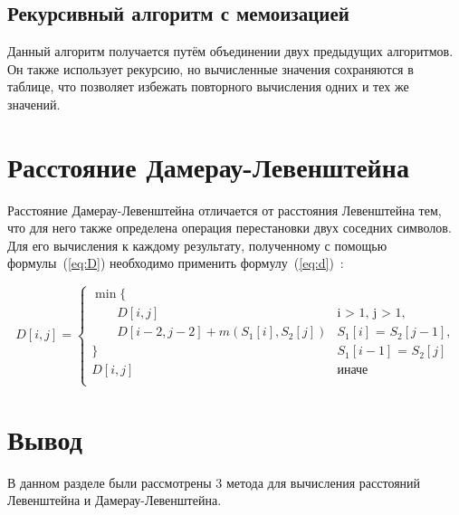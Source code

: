 \subsection{Рекурсивный алгоритм с мемоизацией}

Данный алгоритм получается путём объединении двух предыдущих алгоритмов. Он также использует рекурсию, но вычисленные значения сохраняются в таблице, что позволяет избежать повторного вычисления одних и тех же значений.

\section{Расстояние Дамерау-Левенштейна}

Расстояние Дамерау-Левенштейна отличается от расстояния Левенштейна тем, что для него также определена операция перестановки двух соседних символов. Для его вычисления к каждому результату, полученному с помощью формулы~(\ref{eq:D}) необходимо применить формулу~(\ref{eq:d})~\cite{levenshtein2}:

\begin{equation}
	\label{eq:d}
	D[i, j]= \begin{cases}
		\min \lbrace & \text{} \\
		\qquad D[i, j] & \text{i > 1, j > 1,} \\
		\qquad D[i-2, j-2] + m(S_1[i], S_2[j]) & \text{$S_1[i]$ = $S_2[j-1]$,} \\
		\rbrace & \text{$S_1[i-1]$ = $S_2[j]$} \\
		D[i, j] & \text{иначе}\\
	\end{cases}
\end{equation}

\section{Вывод}

В данном разделе были рассмотрены 3 метода для вычисления расстояний Левенштейна и Дамерау-Левенштейна. 




